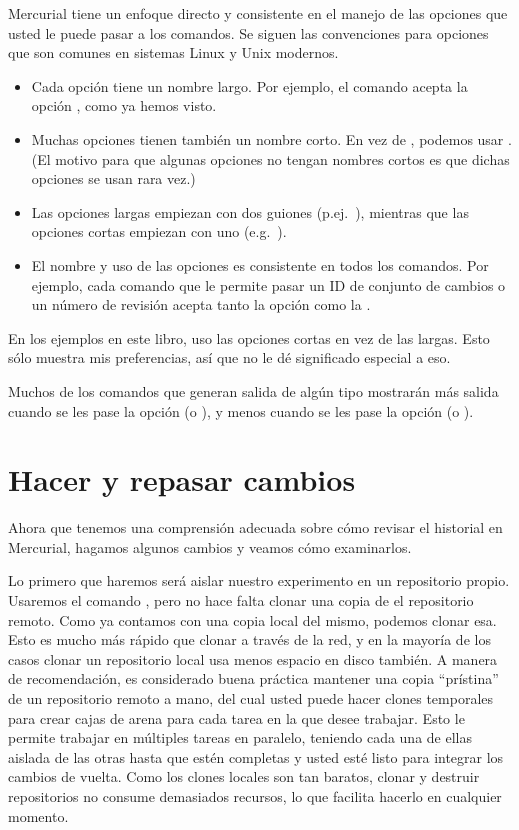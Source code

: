 Mercurial tiene un enfoque directo y consistente en el manejo de las
opciones que usted le puede pasar a los comandos. Se siguen las
convenciones para opciones que son comunes en sistemas Linux y Unix
modernos.
\begin{itemize}
\item Cada opción tiene un nombre largo. Por ejemplo, el comando
     acepta la opción , como ya hemos
    visto.
\item Muchas opciones tienen también un nombre corto. En vez de
    , podemos usar .  (El motivo para
    que algunas opciones no tengan nombres cortos es que dichas
    opciones se usan rara vez.)
\item Las opciones largas empiezan con dos guiones (p.ej.~),
    mientras que las opciones cortas empiezan con uno (e.g.~).
\item El nombre  y uso de las opciones es consistente en todos los
    comandos. Por ejemplo, cada comando que le permite pasar un ID de
    conjunto de cambios o un número de revisión acepta tanto la opción
     como la .
\end{itemize}
En los ejemplos en este libro, uso las opciones cortas en vez de las
largas. Esto sólo muestra mis preferencias, así que no le dé
significado especial a eso.

Muchos de los comandos que generan salida de algún tipo mostrarán más
salida cuando se les pase la opción  (o
), y menos cuando se les pase la opción 
(o ).

\section{Hacer y repasar cambios}

Ahora que tenemos una comprensión adecuada sobre cómo revisar el
historial en Mercurial, hagamos algunos cambios y veamos cómo
examinarlos.

Lo primero que haremos será aislar nuestro experimento en un
repositorio propio. Usaremos el comando , pero no hace
falta clonar una copia de el repositorio remoto. Como ya contamos con
una copia local del mismo, podemos clonar esa. Esto es mucho más
rápido que clonar a través de la red, y en la mayoría de los casos
clonar un repositorio local usa menos espacio en disco también.
A manera de recomendación, es considerado buena práctica mantener una
copia ``prístina'' de un repositorio remoto a mano, del cual usted
puede hacer clones temporales para crear cajas de arena para cada
tarea en la que desee trabajar. Esto le permite trabajar en múltiples
tareas en paralelo, teniendo cada una de ellas aislada de las otras
hasta que estén completas y usted esté listo para integrar los cambios
de vuelta. Como los clones locales son tan baratos, clonar y destruir
repositorios no consume demasiados recursos, lo que facilita hacerlo
en cualquier momento.

